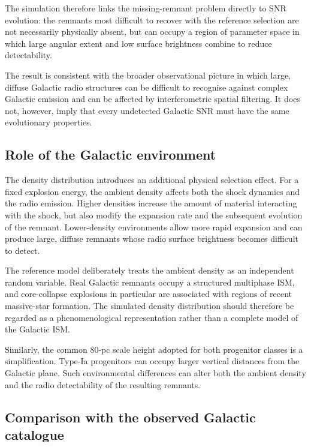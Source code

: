 \documentclass[
aps,
prd,
reprint,
superscriptaddress,
nofootinbib
]{revtex4-2}
\begin{document}
	The simulation therefore links the missing-remnant problem directly to SNR
	evolution: the remnants most difficult to recover with the reference
	selection are not necessarily physically absent, but can occupy a region of
	parameter space in which large angular extent and low surface brightness
	combine to reduce detectability.
	
	The result is consistent with the broader observational picture in which
	large, diffuse Galactic radio structures can be difficult to recognise
	against complex Galactic emission and can be affected by interferometric
	spatial filtering.  It does not, however, imply that every undetected Galactic
	SNR must have the same evolutionary properties.
	
	\subsection{Role of the Galactic environment}
	
	The density distribution introduces an additional physical selection effect.
	For a fixed explosion energy, the ambient density affects both the shock
	dynamics and the radio emission.  Higher densities increase the amount of
	material interacting with the shock, but also modify the expansion rate and
	the subsequent evolution of the remnant.  Lower-density environments allow
	more rapid expansion and can produce large, diffuse remnants whose radio
	surface brightness becomes difficult to detect.
	
	The reference model deliberately treats the ambient density as an independent
	random variable.  Real Galactic remnants occupy a structured multiphase ISM,
	and core-collapse explosions in particular are associated with regions of
	recent massive-star formation.  The simulated density distribution should
	therefore be regarded as a phenomenological representation rather than a
	complete model of the Galactic ISM.
	
	Similarly, the common 80-pc scale height adopted for both progenitor classes
	is a simplification.  Type-Ia progenitors can occupy larger vertical distances
	from the Galactic plane.  Such environmental differences can alter both the
	ambient density and the radio detectability of the resulting remnants.
	
	\subsection{Comparison with the observed Galactic catalogue}
	
\end{document}
